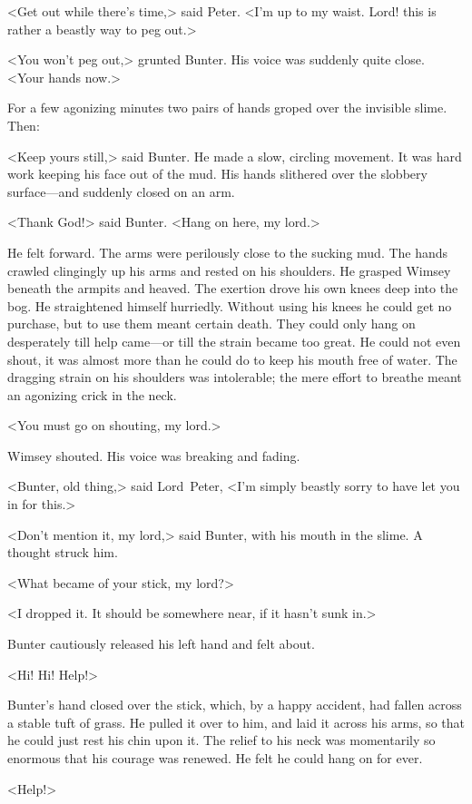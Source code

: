 <Get out while there's time,> said Peter. <I'm up to my waist. Lord!  this is rather a beastly way to peg out.>

<You won't peg out,> grunted Bunter. His voice was suddenly quite close. <Your hands now.>

For a few agonizing minutes two pairs of hands groped over the invisible slime. Then:

<Keep yours still,> said Bunter. He made a slow, circling movement. It was hard work keeping his face out of the mud. His hands slithered over the slobbery surface—and suddenly closed on an arm.

<Thank God!> said Bunter. <Hang on here, my lord.>

He felt forward. The arms were perilously close to the sucking mud. The hands crawled clingingly up his arms and rested on his shoulders. He grasped Wimsey beneath the armpits and heaved. The exertion drove his own knees deep into the bog. He straightened himself hurriedly. Without using his knees he could get no purchase, but to use them meant certain death. They could only hang on desperately till help came—or till the strain became too great. He could not even shout, it was almost more than he could do to keep his mouth free of water. The dragging strain on his shoulders was intolerable; the mere effort to breathe meant an agonizing crick in the neck.

<You must go on shouting, my lord.>

Wimsey shouted. His voice was breaking and fading.

<Bunter, old thing,> said Lord~Peter, <I'm simply beastly sorry to have let you in for this.>

<Don't mention it, my lord,> said Bunter, with his mouth in the slime.  A thought struck him.

<What became of your stick, my lord?>

<I dropped it. It should be somewhere near, if it hasn't sunk in.>

Bunter cautiously released his left hand and felt about.

<Hi! Hi! Help!>

Bunter's hand closed over the stick, which, by a happy accident, had fallen across a stable tuft of grass. He pulled it over to him, and laid it across his arms, so that he could just rest his chin upon it.  The relief to his neck was momentarily so enormous that his courage was renewed. He felt he could hang on for ever.

<Help!> 

